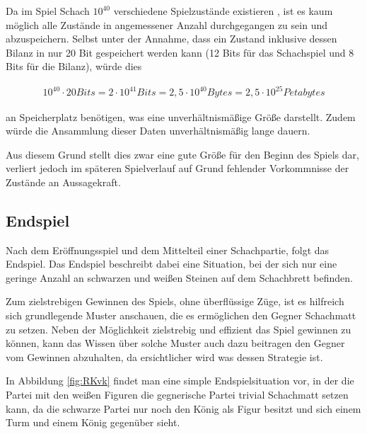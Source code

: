 Da im Spiel Schach $10^{40}$ verschiedene Spielzustände existieren \cite{Stroetmann2018}, ist es kaum möglich alle Zustände in angemessener Anzahl durchgegangen zu sein und abzuspeichern. Selbst unter der Annahme, dass ein Zustand inklusive dessen Bilanz in nur 20 Bit gespeichert werden kann (12 Bits für das Schachspiel \cite{Speight} und 8 Bits für die Bilanz), würde dies 

\begin{equation}
\begin{aligned}
10^{40}  \cdot  20 Bits = 2  \cdot  10^{41} Bits = 2,5  \cdot  10^{40} Bytes = 2,5  \cdot  10^{25} Petabytes
\end{aligned}
\end{equation}

an Speicherplatz benötigen, was eine unverhältnismäßige Größe darstellt. Zudem würde die Ansammlung dieser Daten unverhältnismäßig lange dauern.


Aus diesem Grund stellt dies zwar eine gute Größe für den Beginn des Spiels dar, verliert jedoch im späteren Spielverlauf auf Grund fehlender Vorkommnisse der Zustände an Aussagekraft.


\subsection{Endspiel}\label{finishing_evaluation}
Nach dem Eröffnungsspiel und dem Mittelteil einer Schachpartie, folgt das Endspiel. Das Endspiel beschreibt dabei eine Situation, bei der sich nur eine geringe Anzahl an schwarzen und weißen Steinen auf dem Schachbrett befinden. 

Zum zielstrebigen Gewinnen des Spiels, ohne überflüssige Züge, ist es hilfreich sich grundlegende Muster anschauen, die es ermöglichen den Gegner Schachmatt zu setzen. Neben der Möglichkeit zielstrebig und effizient das Spiel gewinnen zu können, kann das Wissen über solche Muster auch dazu beitragen den Gegner vom Gewinnen abzuhalten, da ersichtlicher wird was dessen Strategie ist.

In Abbildung \ref{fig:RKvk} findet man eine simple Endspielsituation vor, in der die Partei mit den weißen Figuren die gegnerische Partei trivial Schachmatt setzen kann, da die schwarze Partei nur noch den König als Figur besitzt und sich einem Turm und einem König gegenüber sieht.

